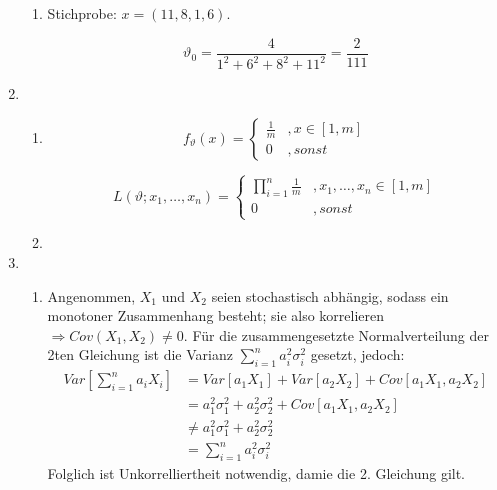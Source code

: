 \documentclass[a4paper]{scrartcl}
\def \blattnr {7}
\begin{document}
\begin{enumerate}[label=\bfseries \blattnr.\arabic*]
\begin{enumerate}
\item 
Stichprobe: $x = (11,8,1,6)$.
  
\begin{equation*}
\vartheta_0 = \frac{4}{1^2 + 6^2 + 8^2 + 11^2} = \frac2{111} 
\end{equation*}

\end{enumerate}

\item 
\begin{enumerate}
\item 

\begin{equation*}
 f_\vartheta(x) = \begin{cases}
		    \frac1m &, x \in [1,m] \\
		    0 &, sonst
                  \end{cases}
\end{equation*}

\begin{equation*}
 L(\vartheta;x_1,\ldots,x_n) = \begin{cases}
		    \prod_{i=1}^n\frac1m &, x_1,\ldots,x_n \in [1,m] \\
		    0 &, sonst
                  \end{cases}
\end{equation*}
 


\item 
\end{enumerate}

\item 
\begin{enumerate}
\item 

Angenommen, $X_1$ und $X_2$ seien stochastisch abhängig, sodass ein monotoner Zusammenhang besteht; sie also korrelieren  $\Rightarrow Cov(X_1,X_2)\neq 0$.
Für die zusammengesetzte Normalverteilung der 2ten Gleichung ist die  Varianz $\sum_{i=1}^n a_i^2\sigma_i^2$ gesetzt, jedoch:
\begin{equation*}
  \begin{split}
 Var\left[ \sum_{i=1}^n a_iX_i \right] 
 &= Var[a_1X_1] + Var[a_2X_2] + Cov[a_1X_1,a_2X_2] \\
 &= a_1^2\sigma_1^2 + a_2^2\sigma_2^2 + Cov[a_1X_1,a_2X_2] \\
 &\neq a_1^2\sigma_1^2 + a_2^2\sigma_2^2 \\
 &= \sum_{i=1}^n a_i^2\sigma_i^2
 \end{split}
\end{equation*}
Folglich ist Unkorrelliertheit notwendig, damie die 2. Gleichung gilt.


\end{enumerate}
\end{enumerate}
\end{document}

